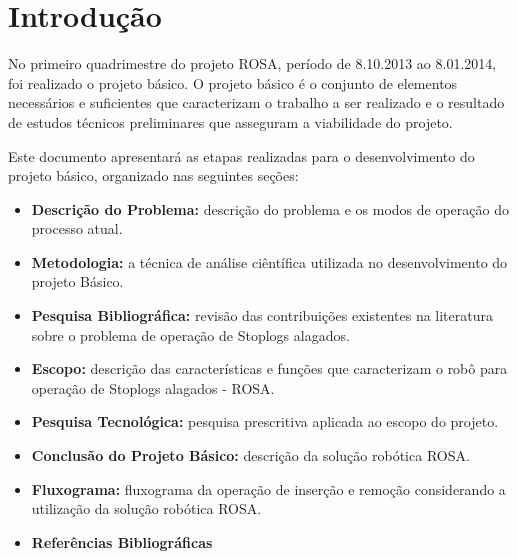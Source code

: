 


\chapter{Introdução}
No primeiro quadrimestre do projeto ROSA, período de 8.10.2013 ao 8.01.2014, foi
realizado o projeto básico. O projeto básico é o conjunto de elementos necessários e suficientes que
caracterizam o trabalho a ser realizado e o resultado de estudos técnicos
preliminares que asseguram a viabilidade do projeto.

Este documento apresentará as etapas realizadas para o desenvolvimento do projeto básico, organizado nas seguintes seções:
    \begin{itemize}
        \item {\bf Descrição do Problema:} descrição do problema e os modos de operação do processo atual.
	\item {\bf Metodologia:} a técnica de análise ciêntífica utilizada no desenvolvimento do projeto Básico.
        \item {\bf Pesquisa Bibliográfica:} revisão das contribuições existentes na literatura sobre o problema de operação de Stoplogs alagados.  
	\item {\bf Escopo:} descrição das características e funções que caracterizam o robô para operação de Stoplogs alagados - ROSA. 
        \item {\bf Pesquisa Tecnológica:} pesquisa prescritiva aplicada ao escopo do projeto. 
        \item {\bf Conclusão do Projeto Básico:} descrição da solução robótica ROSA. 
         \item {\bf Fluxograma:} fluxograma da operação de inserção e remoção considerando a utilização da solução robótica ROSA.   
        \item {\bf Referências Bibliográficas}
 

    \end{itemize}